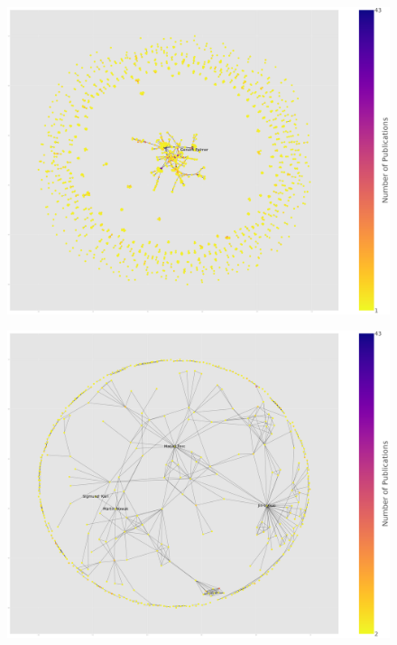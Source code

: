 \documentclass{beamer}
\begin{document}
\begin{frame}
\begin{center}
\begin{figure}[]
        \includegraphics[width=\textwidth]{static/network_one.pdf}
\end{figure}
\end{center}
\end{frame}

\begin{frame}
\begin{center}
\begin{figure}[]
        \includegraphics[width=\textwidth]{static/network_two.pdf}
\end{figure}
\end{center}
\end{frame}
\end{document}
